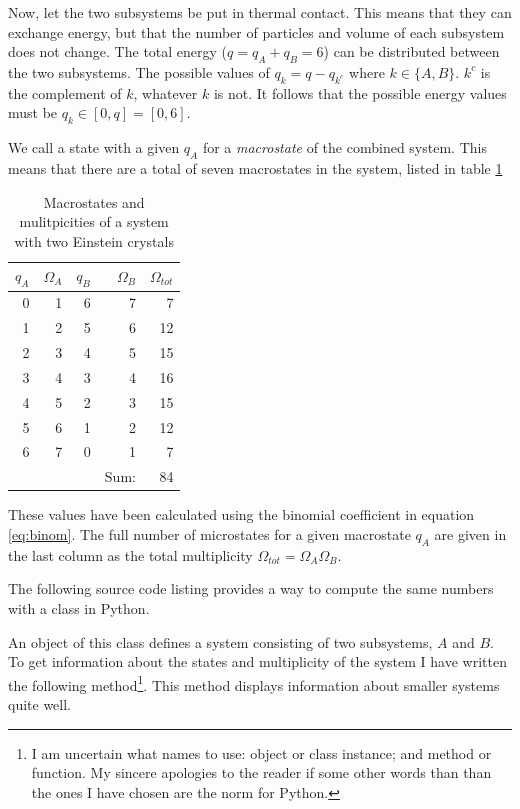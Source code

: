 \documentclass[10pt,a4paper]{amsart}
\begin{document}
Now, let the two subsystems be put in thermal contact. This means that they can exchange energy, but that the number of particles and volume of each subsystem does not change. The total energy ($q=q_A+q_B=6$) can be distributed between the two subsystems. The possible values of $q_k=q-q_{k^c}$ where $k \in \{A,B\}$. $k^c$ is the complement of $k$, whatever $k$ is not. It follows that the possible energy values must be $q_k \in [0,q]=[0,6]$.

We call a state with a given $q_A$ for a \emph{macrostate} of the combined system. This means that there are a total of seven macrostates in the system, listed in table \ref{tab:einsteinmacro}

\begin{table}[h]
\caption{Macrostates and mulitpicities of a system with two Einstein crystals}
\begin{tabular}{rrrrr} \hline
 $q_A$ & $\Omega_A$ & $q_B$ & $\Omega_B$ & $\Omega_{tot}$ \\ \hline
    0  &  1 &  6  &  7   &   7 \\
    1  &  2 &  5  &  6   &  12 \\
    2  &  3 &  4  &  5   &  15 \\
    3  &  4 &  3  &  4   &  16 \\
    4  &  5 &  2  &  3   &  15 \\
    5  &  6 &  1  &  2   &  12 \\
    6  &  7 &  0  &  1   &   7 \\ \hline
       &    &     & Sum: &  84 \\ \hline  
\end{tabular}
\label{tab:einsteinmacro}
\end{table}
These values have been calculated using the binomial coefficient in equation \ref{eq:binom}. The full number of microstates for a given macrostate $q_A$ are given in the last column as the total multiplicity $\Omega_{tot}=\Omega_A\Omega_B$.

The following source code listing provides a way to compute the same numbers with a class in Python.



An object of this class defines a system consisting of two subsystems, $A$ and $B$. To get information about the states and multiplicity of the system I have written the following method\footnote{I am uncertain what names to use: object or class instance; and method or function. My sincere apologies to the reader if some other words than than the ones I have chosen are the norm for Python.}. This method displays information about smaller systems quite well.
\end{document}
